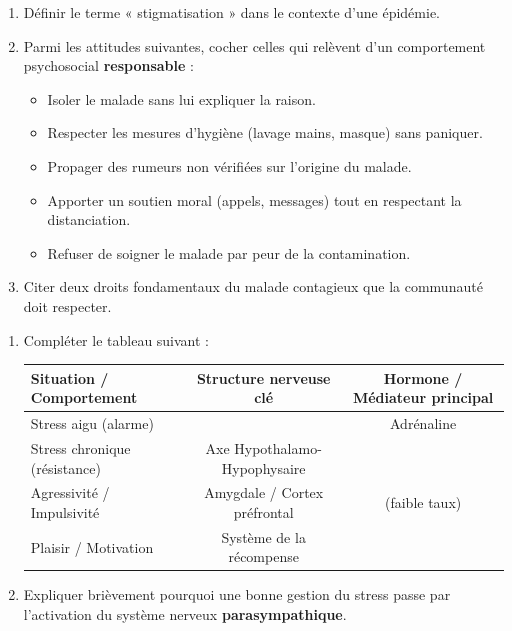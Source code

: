 \documentclass[11pt]{article}
\begin{document}
\begin{exercice}
\begin{enumerate}
    \item Définir le terme « stigmatisation » dans le contexte d'une épidémie.
    \item Parmi les attitudes suivantes, cocher celles qui relèvent d'un comportement psychosocial \textbf{responsable} :
    \begin{itemize}
        \item[$\square$] Isoler le malade sans lui expliquer la raison.
        \item[$\square$] Respecter les mesures d'hygiène (lavage mains, masque) sans paniquer.
        \item[$\square$] Propager des rumeurs non vérifiées sur l'origine du malade.
        \item[$\square$] Apporter un soutien moral (appels, messages) tout en respectant la distanciation.
        \item[$\square$] Refuser de soigner le malade par peur de la contamination.
    \end{itemize}
    \item Citer deux droits fondamentaux du malade contagieux que la communauté doit respecter.
\end{enumerate}
\end{exercice}

\begin{exercice}
\begin{enumerate}
    \item Compléter le tableau suivant :
    \begin{tabular}{|l|c|c|}
    \hline
    \textbf{Situation / Comportement} & \textbf{Structure nerveuse clé} & \textbf{Hormone / Médiateur principal} \\
    \hline
    Stress aigu (alarme) & \underline{\hspace{2.5cm}} & Adrénaline \\
    \hline
    Stress chronique (résistance) & Axe Hypothalamo-Hypophysaire & \underline{\hspace{2.5cm}} \\
    \hline
    Agressivité / Impulsivité & Amygdale / Cortex préfrontal & \underline{\hspace{2.5cm}} (faible taux) \\
    \hline
    Plaisir / Motivation & Système de la récompense & \underline{\hspace{2.5cm}} \\
    \hline
    \end{tabular}
    \item Expliquer brièvement pourquoi une bonne gestion du stress passe par l'activation du système nerveux \textbf{parasympathique}.
\end{enumerate}
\end{exercice}
\end{document}
